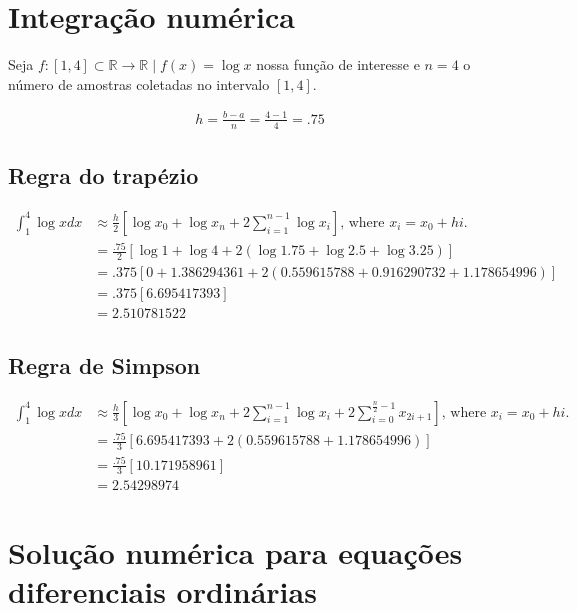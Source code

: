 \documentclass{article}
\begin{document}
	\begin{titlepage}
		\maketitle
	\end{titlepage}
	
	
	\section{Integração numérica}
	
	Seja $f \colon [1, 4] \subset \mathbb{R} \to \mathbb{R} \mid f(x) = \log x$ nossa função de interesse e $n=4$ o número de amostras coletadas no intervalo $[1, 4]$.
	
	\begin{align*}
		h = \frac{b - a}{n} = \frac{4-1}{4} = .75
	\end{align*}
	
	\subsection{Regra do trapézio}
		\begin{align*}
		\int_{1}^{4} \log x dx &\approx \frac{h}{2} [\log x_0 + \log x_n + 2 \sum_{i=1}^{n-1}  \log x_i] \text{, where } x_i = x_0+hi. \\
		&= \frac{.75}{2} [\log 1 + \log 4 + 2(\log 1.75 + \log 2.5 + \log 3.25)] \\
		&= .375 [0 + 1.386294361 + 2(0.559615788 + 0.916290732 + 1.178654996)] \\
		&= .375[6.695417393] \\
		&= 2.510781522
		\end{align*}

	\subsection{Regra de Simpson}
		\begin{align*}
		\int_{1}^{4} \log x dx &\approx \frac{h}{3} [\log x_0 + \log x_n + 2 \sum_{i=1}^{n-1}  \log x_i + 2 \sum_{i=0}^{\frac{n}{2}-1} x_{2i+1}] \text{, where } x_i = x_0+hi. \\
		&= \frac{.75}{3} [6.695417393 + 2(0.559615788 + 1.178654996)] \\
		&= \frac{.75}{3}[10.171958961] \\
		&= 2.54298974
		\end{align*}

	\newpage
	\section{Solução numérica para equações diferenciais ordinárias}
	
\end{document}
